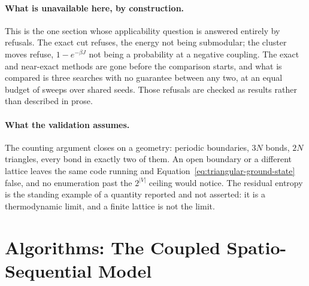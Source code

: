 \documentclass[11pt,a4paper]{article}
\begin{document}
\paragraph{What is unavailable here, by construction.}
This is the one section whose applicability question is answered entirely by
refusals. The exact cut refuses, the energy not being submodular; the cluster
moves refuse, $1 - e^{-\beta J}$ not being a probability at a negative
coupling. The exact and near-exact methods are gone before the comparison
starts, and what is compared is three searches with no guarantee between any
two, at an equal budget of sweeps over shared seeds. Those refusals are checked
as results rather than described in prose.

\paragraph{What the validation assumes.}
The counting argument closes on a geometry: periodic boundaries, $3N$ bonds,
$2N$ triangles, every bond in exactly two of them. An open boundary or a
different lattice leaves the same code running and
Equation~\ref{eq:triangular-ground-state} false, and no enumeration past the
$2^{|V|}$ ceiling would notice. The residual entropy is the standing example
of a quantity reported and not asserted: it is a thermodynamic limit, and a
finite lattice is not the limit.

\section{Algorithms: The Coupled Spatio-Sequential Model}
\label{sec:coupled:algorithms}
\end{document}
